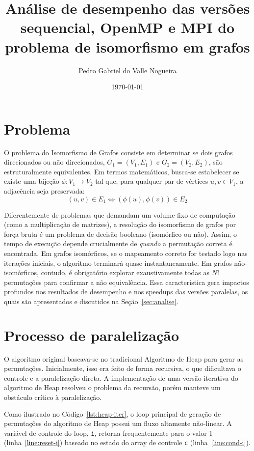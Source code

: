 \documentclass[12pt,a4paper]{article}
\title{\textbf{Análise de desempenho das versões sequencial, OpenMP e MPI do
problema de isomorfismo em grafos}}
\author{Pedro Gabriel do Valle Nogueira}
\date{\today}
\begin{document}
\maketitle

\section{Problema}

O problema do Isomorfismo de Grafos consiste em determinar se dois grafos
direcionados ou não direcionados,
$G_1 = (V_1, E_1)$ e $G_2 = (V_2, E_2)$,
são estruturalmente equivalentes.
Em termos matemáticos,
busca-se estabelecer se existe uma bijeção $\phi: V_1 \to V_2$ tal que,
para qualquer par de vértices $u, v \in V_1$,
a adjacência seja preservada:
\begin{equation}
(u, v) \in E_1 \iff (\phi(u), \phi(v)) \in E_2
\end{equation}

Diferentemente de problemas que demandam um volume fixo de computação (como a
multiplicação de matrizes),
a resolução do isomorfismo de grafos por força bruta é um problema de decisão booleano (isomórfico ou não).
Assim,
o tempo de execução depende crucialmente de \textit{quando} a permutação correta é encontrada.
Em grafos isomórficos,
se o mapeamento correto for testado logo nas iterações iniciais,
o algoritmo terminará quase instantaneamente.
Em grafos não-isomórficos,
contudo,
é obrigatório explorar exaustivamente todas as $N!$ permutações para confirmar a não equivalência.
Essa característica gera impactos profundos nos resultados de desempenho e nos speedups das versões paralelas,
os quais são apresentados e discutidos na Seção~\ref{sec:analise}.

\section{Processo de paralelização}

O algoritmo original baseava-se no tradicional Algoritmo de Heap para gerar as permutações.
Inicialmente,
isso era feito de forma recursiva,
o que dificultava o controle e a paralelização direta.
A implementação de uma versão iterativa do algoritmo de Heap resolveu o problema da recursão,
porém manteve um obstáculo crítico à paralelização.

Como ilustrado no Código~\ref{lst:heap-iter},
o loop principal de geração de permutações do algoritmo de Heap possui um fluxo altamente não-linear.
A variável de controle do loop,
\texttt{i},
retorna frequentemente para o valor 1 (linha~\ref{line:reset-i}) baseado no estado do array de controle \texttt{c} (linha~\ref{line:cond-i}).
\end{document}
